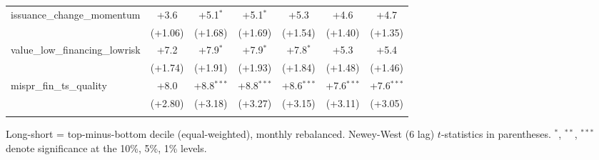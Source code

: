 \begin{table}[htbp]
\begin{threeparttable}
\begin{tabular}{lcccccc}
\addlinespace
issuance\_change\_momentum & +3.6 & +5.1$^{*}$ & +5.1$^{*}$ & +5.3 & +4.6 & +4.7 \\
 & (+1.06) & (+1.68) & (+1.69) & (+1.54) & (+1.40) & (+1.35) \\
\addlinespace
value\_low\_financing\_lowrisk & +7.2 & +7.9$^{*}$ & +7.9$^{*}$ & +7.8$^{*}$ & +5.3 & +5.4 \\
 & (+1.74) & (+1.91) & (+1.93) & (+1.84) & (+1.48) & (+1.46) \\
\addlinespace
mispr\_fin\_ts\_quality & +8.0 & +8.8$^{***}$ & +8.8$^{***}$ & +8.6$^{***}$ & +7.6$^{***}$ & +7.6$^{***}$ \\
 & (+2.80) & (+3.18) & (+3.27) & (+3.15) & (+3.11) & (+3.05) \\
\addlinespace
\bottomrule
\end{tabular}
\begin{tablenotes}\footnotesize
\item Long-short = top-minus-bottom decile (equal-weighted), monthly rebalanced. Newey-West (6 lag) $t$-statistics in parentheses. $^{*}$, $^{**}$, $^{***}$ denote significance at the 10\%, 5\%, 1\% levels.
\end{tablenotes}
\end{threeparttable}
\end{table}